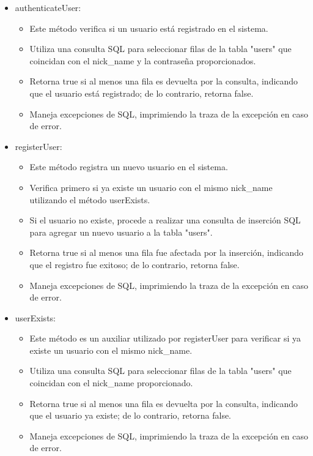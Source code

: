 \documentclass{article}
\begin{document}
        \begin{itemize}	
            \item authenticateUser:
            \begin{itemize}	
                \item Este método verifica si un usuario está registrado en el sistema.
                \item Utiliza una consulta SQL para seleccionar filas de la tabla "users" que coincidan con el nick\_name y la contraseña proporcionados.
                \item Retorna true si al menos una fila es devuelta por la consulta, indicando que el usuario está registrado; de lo contrario, retorna false.
                \item Maneja excepciones de SQL, imprimiendo la traza de la excepción en caso de error.
            \end{itemize}
            \item registerUser:
            \begin{itemize}
                \item Este método registra un nuevo usuario en el sistema.
                \item Verifica primero si ya existe un usuario con el mismo nick\_name utilizando el método userExists.
                \item Si el usuario no existe, procede a realizar una consulta de inserción SQL para agregar un nuevo usuario a la tabla "users".
                \item Retorna true si al menos una fila fue afectada por la inserción, indicando que el registro fue exitoso; de lo contrario, retorna false.
                \item Maneja excepciones de SQL, imprimiendo la traza de la excepción en caso de error.
            \end{itemize}
            \item userExists:
            \begin{itemize}
                \item Este método es un auxiliar utilizado por registerUser para verificar si ya existe un usuario con el mismo nick\_name.
                \item Utiliza una consulta SQL para seleccionar filas de la tabla "users" que coincidan con el nick\_name proporcionado.
                \item Retorna true si al menos una fila es devuelta por la consulta, indicando que el usuario ya existe; de lo contrario, retorna false.
                \item Maneja excepciones de SQL, imprimiendo la traza de la excepción en caso de error.
            \end{itemize}
	\end{itemize}
\end{document}
